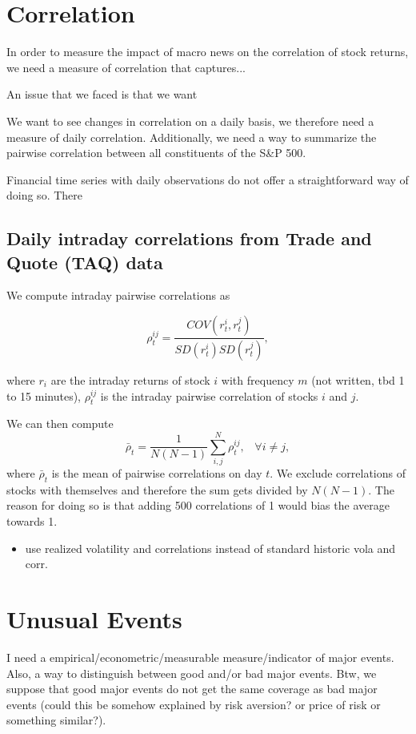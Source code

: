 \section{Correlation}
In order to measure the impact of macro news on the correlation of stock returns, we need a measure of correlation that captures...

An issue that we faced is that we want



We want to see changes in correlation on a daily basis, we therefore need a measure of daily correlation. Additionally, we need a way to summarize the pairwise correlation between all constituents of the S\&P 500.

Financial time series with daily observations do not offer a straightforward way of doing so. There


\subsection{Daily intraday correlations from Trade and Quote (TAQ) data}
We compute intraday pairwise correlations as

$$
    \rho^{ij}_t = \frac{COV(r_t^i,r_t^j)}{SD(r_t^i)SD(r_t^j)},
$$

where $r_i$ are the intraday returns of stock $i$ with frequency $m$ (not written, tbd 1 to 15 minutes), $\rho_t^{ij}$ is the intraday pairwise correlation of stocks $i$ and $j$.

We can then compute
$$
    \bar{\rho}_t = \frac{1}{N(N-1)} \sum_{i,j}^{N} \rho^{ij}_t, \; \; \;
    \forall i\ne j,
$$
where $\bar{\rho}_t$ is the mean of pairwise correlations on day $t$. We exclude correlations of stocks with themselves and therefore the sum gets divided by $N(N-1)$. The reason for doing so is that adding 500 correlations of 1 would bias the average towards 1.

\begin{itemize}
    \item use realized volatility and correlations instead of standard historic vola and corr.
\end{itemize}

\section{Unusual Events}
I need a empirical/econometric/measurable measure/indicator of major events. Also, a way to distinguish between good and/or bad major events. Btw, we suppose that good major events do not get the same coverage as bad major events (could this be somehow explained by risk aversion? or price of risk or something similar?).

